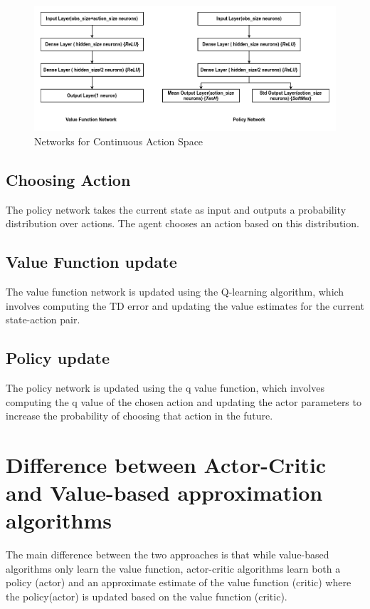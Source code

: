 \documentclass{article} %
\begin{document}
\begin{figure}[H]
    \begin{center}
        \includegraphics[width=\textwidth]{contionous.png}
    \end{center}
    \caption{Networks for Continuous Action Space}
\end{figure}

\subsection{Choosing Action}
The policy network takes the current state as input and outputs a probability distribution over actions. The agent chooses an action based on this distribution.

\subsection{Value Function update}
The value function network is updated using the Q-learning algorithm, which involves computing the TD error and updating the value estimates for the current state-action pair.

\subsection{Policy update}
The policy network is updated using the q value function, which involves computing the q value of the chosen action and updating the actor parameters to increase the probability of choosing that action in the future.

\section{Difference between Actor-Critic and Value-based approximation algorithms}

The main difference between the two approaches is that while value-based algorithms only learn the value function, actor-critic algorithms learn both a policy (actor) and an approximate estimate of the value function (critic) where the policy(actor) is updated based on the value function (critic).
\end{document}
